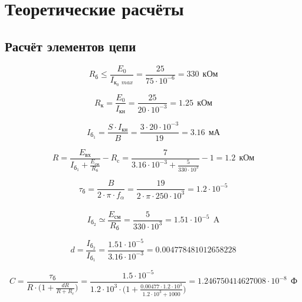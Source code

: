 \section{Теоретические расчёты}

\subsection{Расчёт элементов цепи}

\begin{displaymath}
R_\text{б} \leq \frac{E_0}{I_{\text{к}_0\ \ max}} = \frac{25}{75 \cdot 10^{-6}} = 330\ \ \text{кОм}
\end{displaymath}

\begin{displaymath}
R_\text{к} = \frac{E_0}{I_\text{кн}} = \frac{25}{20 \cdot 10^{-3}} = 1.25\ \ \text{кОм}
\end{displaymath}

\begin{displaymath}
I_{\text{б}_1} = \frac{S \cdot I_\text{кн}}{B} = \frac{3 \cdot 20 \cdot 10^{-3}}{19} = 3.16\ \ \text{мА}
\end{displaymath}

\begin{displaymath}
R = \frac{E_\text{вх}}{I_{\text{б}_1} + \frac{E_\text{см}}{R_\text{б}}} - R_\text{c} = \frac{7}{3.16 \cdot 10^{-3} + \frac{5}{330 \cdot 10^3}} - 1 = 1.2\ \ \text{кОм}
\end{displaymath}

\begin{displaymath}
\tau_{\text{б}} = \frac{B}{2 \cdot \pi \cdot f_\alpha} = \frac{19}{2 \cdot \pi \cdot 250 \cdot 10^3} = 1.2 \cdot 10^{-5}
\end{displaymath}\\[1cm]

\begin{displaymath}
I_{\text{б}_2} \simeq \frac{E_\text{см}}{R_\text{б}} = \frac{5}{330 \cdot 10^3} = 1.51 \cdot 10^{-5}\ \ \text{A}
\end{displaymath}

\begin{displaymath}
d = \frac{I_{\text{б}_2}}{I_{\text{б}_1}} = \frac{ 1.51 \cdot 10^{-5}}{3.16 \cdot 10^{-3}} = 0.004778481012658228
\end{displaymath}

\begin{displaymath}
C = \frac{\tau_{\text{б}}}{R \cdot \Big ( 1 + \frac{dR}{R+R_c} \Big )} = \frac{1.5 \cdot 10^{-5}}{1.2 \cdot 10^3 \cdot \Big ( 1 + \frac{0.00477 \cdot 1.2 \cdot 10^3}{1.2 \cdot 10^3+1000} \Big )} = 1.246750414627008 \cdot 10^{-8}\ \ \text{Ф}
\end{displaymath}

